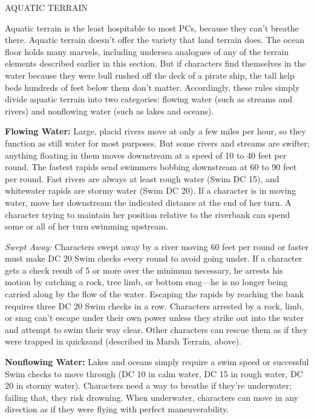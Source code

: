 \documentclass{article}
\begin{document}
\vspace{12pt}
AQUATIC TERRAIN

Aquatic terrain is the least hospitable to most PCs, because they can't breathe 
there. Aquatic terrain doesn't offer the variety that land terrain does. The ocean 
floor holds many marvels, including undersea analogues of any of the terrain elements 
described earlier in this section. But if characters find themselves in the water 
because they were bull rushed off the deck of a pirate ship, the tall kelp beds 
hundreds of feet below them don't matter. Accordingly, these rules simply divide 
aquatic terrain into two categories: flowing water (such as streams and rivers) 
and nonflowing water (such as lakes and oceans).

\textbf{Flowing Water:} Large, placid rivers move at only a few miles per hour, 
so they function as still water for most purposes. But some rivers and streams 
are swifter; anything floating in them moves downstream at a speed of 10 to 40 
feet per round. The fastest rapids send swimmers bobbing downstream at 60 to 90 
feet per round. Fast rivers are always at least rough water (Swim DC 15), and whitewater 
rapids are stormy water (Swim DC 20). If a character is in moving water, move her 
downstream the indicated distance at the end of her turn. A character trying to 
maintain her position relative to the riverbank can spend some or all of her turn 
swimming upstream.

\textit{Swept Away: }Characters swept away by a river moving 60 feet per round 
or faster must make DC 20 Swim checks every round to avoid going under. If a character 
gets a check result of 5 or more over the minimum necessary, he arrests his motion 
by catching a rock, tree limb, or bottom snag---he is no longer being carried along 
by the flow of the water. Escaping the rapids by reaching the bank requires three 
DC 20 Swim checks in a row. Characters arrested by a rock, limb, or snag can't 
escape under their own power unless they strike out into the water and attempt 
to swim their way clear. Other characters can rescue them as if they were trapped 
in quicksand (described in Marsh Terrain, above). 

\textbf{Nonflowing Water:} Lakes and oceans simply require a swim speed or successful 
Swim checks to move through (DC 10 in calm water, DC 15 in rough water, DC 20 in 
stormy water). Characters need a way to breathe if they're underwater; failing 
that, they risk drowning. When underwater, characters can move in any direction 
as if they were flying with perfect maneuverability.
\end{document}
